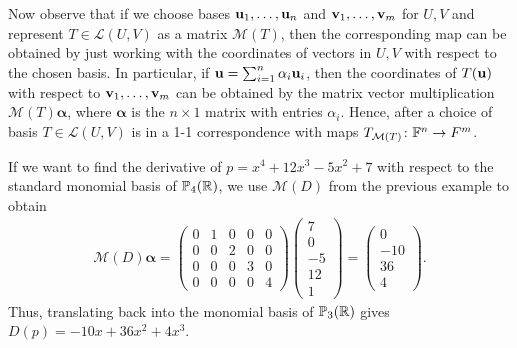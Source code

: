 \documentclass{article}
\begin{document}
Now observe that if we choose bases ${\mathbf{u}}_1, \ldots, {\mathbf{u}}_n$ and ${\mathbf{v}}_1, \ldots, {\mathbf{v}}_m$ for $U,V$ and represent $T\in \mathcal{L}(U,V)$ as a matrix $\mathcal{M}(T)$, then the corresponding map can be obtained by just working with the coordinates of vectors in $U,V$ with respect to the chosen basis. In particular, if ${\mathbf{u}} = \sum_{i=1}^n \alpha_i {\mathbf{u}}_i$, then the coordinates of $T({\mathbf{u}})$ with respect to ${\mathbf{v}}_1, \ldots, {\mathbf{v}}_m$ can be obtained by the matrix vector multiplication $\mathcal{M}(T)\boldsymbol{\alpha}$, where $\boldsymbol{\alpha}$ is the $n\times 1$ matrix with entries $\alpha_i$. Hence, after a choice of basis $T\in \mathcal{L}(U,V)$ is in a 1-1 correspondence with maps $T_{\mathcal{M}(T)} \colon {\mathbb{F}}^n \to F^m$. 

\begin{example}
If we want to find the derivative of $p= x^4 +12x^3 -5x^2 +7$ with respect to the standard monomial basis of $\mathbb{P}_4({\mathbb{R}})$, we use $\mathcal{M}(D)$ from the previous example to obtain
\begin{align*}
    \mathcal{M}(D)\boldsymbol{\alpha} = \begin{pmatrix}
    0 & 1 & 0 & 0 & 0 \\
    0 & 0 & 2 & 0 & 0 \\
    0 & 0 & 0 & 3 & 0 \\
    0 & 0 & 0 & 0 & 4
     \end{pmatrix} \begin{pmatrix} 7\\ 0\\ -5\\12\\1
     \end{pmatrix} = \begin{pmatrix} 0 \\ -10\\ 36\\4
     \end{pmatrix}.
\end{align*}
Thus, translating back into the monomial basis of $\mathbb{P}_3({\mathbb{R}})$ gives $D(p) = -10x + 36x^2 +4x^3$.
\end{example}
\end{document}
